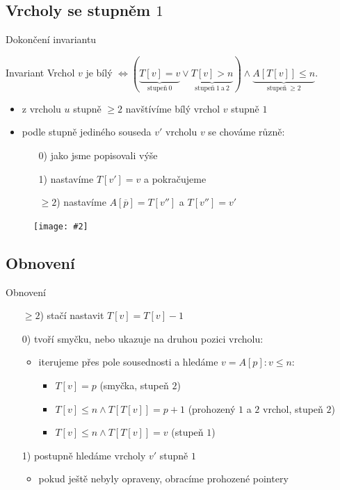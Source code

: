 \documentclass[czech]{beamer}
\makeatletter
\newcommand{\fitimage}[2][\@nil]{
	\begin{figure}
		\begin{adjustbox}{width=0.9\textwidth, totalheight=\textheight-2\baselineskip-2\baselineskip,keepaspectratio}
			\texttt{[image: \#2]}
		\end{adjustbox}
		\def\tmp{#1}%
	 \ifx\tmp\@nnil
			\else
			\caption{#1}
		\fi
	\end{figure}
}
\makeatother
\begin{document}
	\subsection{Vrcholy se stupněm $1$}
	\begin{frame}{Dokončení invariantu}
		\begin{block}{Invariant}
			Vrchol $v$ je bílý $\iff (\underbrace{T\left[v\right] = v}_{\text{stupeň}\ 0} \lor \underbrace{T[v] > n}_{\text{stupeň}\ 1\ \text{a}\ 2}) \land \underbrace{A[T[v]] \le n}_{\text{stupeň}\ \ge2}$.
		\end{block}
		\vfill
		\begin{itemize}
			\item z vrcholu $u$ stupně $\ge 2$ navštívíme bílý vrchol $v$ stupně $1$
			\item podle stupně jediného souseda $v'$ vrcholu $v$ se chováme různě:
			\begin{enumerate}
				\item[0)] jako jsme popisovali výše
				\item[1)] nastavíme $T[v'] = v$ a pokračujeme
				\item[$\ge 2$)] nastavíme $A[\overline{p}] = T[v'']$ a $T[v''] = v'$
			\end{enumerate}
		\end{itemize}
		\fitimage{images/deg1.png}
	\end{frame}

	\subsection{Obnovení}
	\begin{frame}{Obnovení}
		\hfill
		\begin{minipage}[t]{0.97\textwidth}
			\begin{enumerate}
				\item[$\ge 2$)] stačí nastavit $T[v] = T[v] - 1$
				\item[0)] tvoří smyčku, nebo ukazuje na druhou pozici vrcholu:
				\begin{itemize}
					\item iterujeme přes pole sousednosti a hledáme $v = A[p]: v \le n$:
					\begin{itemize}
						\item $T[v] = p$ (smyčka, stupeň $2$)
						\item $T[v] \le n \land T[T[v]] = p + 1$ (prohozený $1$ a $2$ vrchol, stupeň $2$)
						\item $T[v] \le n \land T[T[v]] = v$ (stupeň $1$)
					\end{itemize}
				\end{itemize}
				\item[1)] postupně hledáme vrcholy $v'$ stupně $1$
				\begin{itemize}
					\item pokud ještě nebyly opraveny, obracíme prohozené pointery
				\end{itemize}
			\end{enumerate}
		\end{minipage}
	\end{frame}
\end{document}
